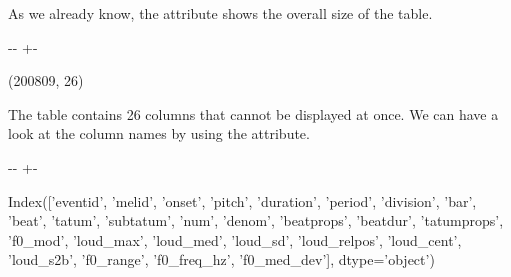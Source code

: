 \documentclass[letterpaper,10pt,english]{sphinxmanual}
\newlength\nbsphinxcodecellspacing
\begin{document}
As we already know, the  attribute shows the overall size of the table.

{
\begin{sphinxVerbatim}[commandchars=\\\{\}]
\llap{\color{nbsphinxin}[11]:\,\hspace{\fboxrule}\hspace{\fboxsep}}
\end{sphinxVerbatim}
}

{

\kern-\sphinxverbatimsmallskipamount\kern-\baselineskip
\kern+\FrameHeightAdjust\kern-\fboxrule
\vspace{\nbsphinxcodecellspacing}

\begin{sphinxVerbatim}[commandchars=\\\{\}]
\llap{\color{nbsphinxout}[11]:\,\hspace{\fboxrule}\hspace{\fboxsep}}(200809, 26)
\end{sphinxVerbatim}
}

The  table contains 26 columns that cannot be displayed at once. We can have a look at the column names by using the  attribute.

{
\begin{sphinxVerbatim}[commandchars=\\\{\}]
\llap{\color{nbsphinxin}[13]:\,\hspace{\fboxrule}\hspace{\fboxsep}}
\end{sphinxVerbatim}
}

{

\kern-\sphinxverbatimsmallskipamount\kern-\baselineskip
\kern+\FrameHeightAdjust\kern-\fboxrule
\vspace{\nbsphinxcodecellspacing}

\begin{sphinxVerbatim}[commandchars=\\\{\}]
\llap{\color{nbsphinxout}[13]:\,\hspace{\fboxrule}\hspace{\fboxsep}}Index(['eventid', 'melid', 'onset', 'pitch', 'duration', 'period', 'division',
       'bar', 'beat', 'tatum', 'subtatum', 'num', 'denom', 'beatprops',
       'beatdur', 'tatumprops', 'f0\_mod', 'loud\_max', 'loud\_med', 'loud\_sd',
       'loud\_relpos', 'loud\_cent', 'loud\_s2b', 'f0\_range', 'f0\_freq\_hz',
       'f0\_med\_dev'],
      dtype='object')
\end{sphinxVerbatim}
}
\end{document}
